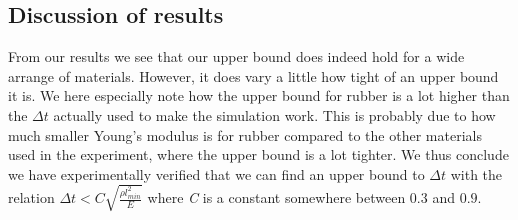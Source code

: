 \subsection{Discussion of results}
From our results we see that our upper bound does indeed hold for a wide arrange of materials. However, it does vary a little how tight of an upper bound it is. We here especially note how the upper bound for rubber is a lot higher than the $\Delta t$ actually used to make the simulation work. This is probably due to how much smaller Young's modulus is for rubber compared to the other materials used in the experiment, where the upper bound is a lot tighter. We thus conclude we have experimentally verified that we can find an upper bound to $\Delta t$ with the relation $\Delta t < C\sqrt{\frac{\rho l_{min}^2}{E}}$ where \textit{C} is a constant somewhere between $0.3$ and $0.9$.